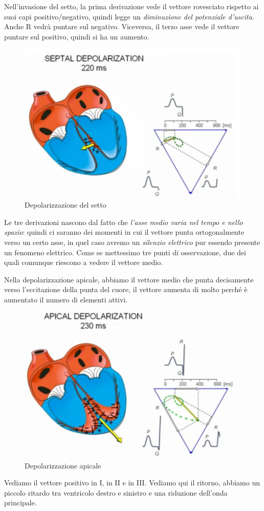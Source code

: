 \documentclass[a4paper,12pt]{article}
\begin{document}
Nell'invasione del setto, la prima derivazione vede il vettore rovesciato rispetto ai suoi capi positivo/negativo, quindi legge un \emph{diminuzione del potenziale d'uscita}. Anche R vedrà puntare sul negativo. Viceversa, il terzo asse vede il vettore puntare sul positivo, quindi si ha un aumento.
\begin{figure}[H]
\centering
\includegraphics[scale=0.4]{immagine/quattordici.jpg}
\caption{Depolarizzazione del setto}
\end{figure}

Le tre derivazioni nascono dal fatto che \emph{l'asse medio varia nel tempo e nello spazio}: quindi ci saranno dei momenti in cui il vettore punta ortogonalmente verso un certo asse, in quel caso avremo un \emph{silenzio elettrico} pur essendo presente un fenomeno elettrico. Come se mettessimo tre punti di osservazione, due dei quali comunque riescono a vedere il vettore medio.

Nella depolarizzazione apicale, abbiamo il vettore medio che punta decisamente verso l'eccitazione della punta del cuore, il vettore aumenta di molto perché è aumentato il numero di elementi attivi.
\begin{figure}[H]
\centering
\includegraphics[scale=0.4]{immagine/quindici.jpg}
\caption{Depolarizzazione apicale}
\end{figure}
Vediamo il vettore positivo in I, in II e in III.
Vediamo qui il ritorno, abbiamo un piccolo ritardo tra ventricolo destro e sinistro e una riduzione dell'onda principale. 
\end{document}
